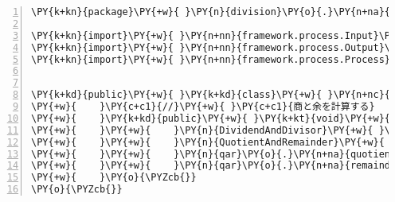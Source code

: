 \begin{Verbatim}[commandchars=\\\{\},numbers=left,firstnumber=1,stepnumber=1,frame=single,fontsize=\small]
\PY{k+kn}{package}\PY{+w}{ }\PY{n}{division}\PY{o}{.}\PY{n+na}{process}\PY{o}{;}

\PY{k+kn}{import}\PY{+w}{ }\PY{n+nn}{framework.process.Input}\PY{o}{;}
\PY{k+kn}{import}\PY{+w}{ }\PY{n+nn}{framework.process.Output}\PY{o}{;}
\PY{k+kn}{import}\PY{+w}{ }\PY{n+nn}{framework.process.Process}\PY{o}{;}


\PY{k+kd}{public}\PY{+w}{ }\PY{k+kd}{class}\PY{+w}{ }\PY{n+nc}{DivisionProcess}\PY{+w}{ }\PY{k+kd}{implements}\PY{+w}{ }\PY{n}{Process}\PY{+w}{ }\PY{o}{\PYZob{}}
\PY{+w}{    }\PY{c+c1}{//}\PY{+w}{ }\PY{c+c1}{商と余を計算する}
\PY{+w}{    }\PY{k+kd}{public}\PY{+w}{ }\PY{k+kt}{void}\PY{+w}{ }\PY{n+nf}{process}\PY{o}{(}\PY{n}{Input}\PY{+w}{ }\PY{n}{input}\PY{o}{,}\PY{+w}{ }\PY{n}{Output}\PY{+w}{ }\PY{n}{output}\PY{o}{)}\PY{+w}{ }\PY{o}{\PYZob{}}
\PY{+w}{    }\PY{+w}{    }\PY{n}{DividendAndDivisor}\PY{+w}{ }\PY{n}{dad}\PY{+w}{ }\PY{o}{=}\PY{+w}{ }\PY{o}{(}\PY{n}{DividendAndDivisor}\PY{o}{)}\PY{+w}{ }\PY{n}{input}\PY{o}{;}
\PY{+w}{    }\PY{+w}{    }\PY{n}{QuotientAndRemainder}\PY{+w}{ }\PY{n}{qar}\PY{+w}{ }\PY{o}{=}\PY{+w}{ }\PY{o}{(}\PY{n}{QuotientAndRemainder}\PY{o}{)}\PY{+w}{ }\PY{n}{output}\PY{o}{;}
\PY{+w}{    }\PY{+w}{    }\PY{n}{qar}\PY{o}{.}\PY{n+na}{quotient}\PY{+w}{ }\PY{o}{=}\PY{+w}{ }\PY{n}{dad}\PY{o}{.}\PY{n+na}{dividend}\PY{+w}{ }\PY{o}{/}\PY{+w}{ }\PY{n}{dad}\PY{o}{.}\PY{n+na}{divisor}\PY{o}{;}
\PY{+w}{    }\PY{+w}{    }\PY{n}{qar}\PY{o}{.}\PY{n+na}{remainder}\PY{+w}{ }\PY{o}{=}\PY{+w}{ }\PY{n}{dad}\PY{o}{.}\PY{n+na}{dividend}\PY{+w}{ }\PY{o}{\PYZpc{}}\PY{+w}{ }\PY{n}{dad}\PY{o}{.}\PY{n+na}{divisor}\PY{o}{;}
\PY{+w}{    }\PY{o}{\PYZcb{}}
\PY{o}{\PYZcb{}}
\end{Verbatim}
